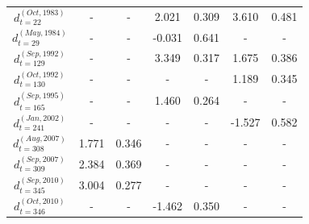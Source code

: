 \documentclass[a4paper]{IEEEtran}
\providecommand{\DIFadd}[1]{{\protect\color{blue}\uwave{#1}}} %
\providecommand{\DIFdel}[1]{{\protect\color{red}\sout{#1}}}                      %
\providecommand{\DIFaddFL}[1]{\DIFadd{#1}} %
\providecommand{\DIFdelFL}[1]{\DIFdel{#1}} %
\providecommand{\DIFaddbeginFL}{} %
\providecommand{\DIFaddendFL}{} %
\providecommand{\DIFdelbeginFL}{} %
\providecommand{\DIFdelendFL}{} %
\begin{document}
\begin{table}[htbp]
\begin{tabular}{ccccccc}
\DIFdelbeginFL \DIFdelFL{$d_{t=22}^{(Oct, 1983)}$   }\DIFdelendFL \DIFaddbeginFL \DIFaddFL{$D_{t=22}^{(Oct, 1983)}$   }\DIFaddendFL & -          & -         & 2.021      & 0.309     & 3.610      & 0.481     \\
\DIFdelbeginFL \DIFdelFL{$d_{t=29}^{(May, 1984)}$   }\DIFdelendFL \DIFaddbeginFL \DIFaddFL{$D_{t=29}^{(May, 1984)}$   }\DIFaddendFL & -          & -         & -0.031      & 0.641     & -          & -     \\
\DIFdelbeginFL \DIFdelFL{$d_{t=129}^{(Sep, 1992)}$  }\DIFdelendFL \DIFaddbeginFL \DIFaddFL{$D_{t=129}^{(Sep, 1992)}$  }\DIFaddendFL & -          & -         & 3.349      & 0.317     & 1.675      & 0.386     \\
\DIFdelbeginFL \DIFdelFL{$d_{t=130}^{(Oct, 1992)}$  }\DIFdelendFL \DIFaddbeginFL \DIFaddFL{$D_{t=130}^{(Oct, 1992)}$  }\DIFaddendFL & -          & -         & -          & -         & 1.189      & 0.345     \\
\DIFdelbeginFL \DIFdelFL{$d_{t=165}^{(Sep, 1995)}$  }\DIFdelendFL \DIFaddbeginFL \DIFaddFL{$D_{t=165}^{(Sep, 1995)}$  }\DIFaddendFL & -          & -         & 1.460      & 0.264     & -          & -     \\
\DIFdelbeginFL \DIFdelFL{$d_{t=241}^{(Jan, 2002)}$  }\DIFdelendFL \DIFaddbeginFL \DIFaddFL{$D_{t=241}^{(Jan, 2002)}$  }\DIFaddendFL & -          & -         & -          & -         &-1.527      & 0.582     \\
\DIFdelbeginFL \DIFdelFL{$d_{t=308}^{(Aug, 2007)}$  }\DIFdelendFL \DIFaddbeginFL \DIFaddFL{$D_{t=308}^{(Aug, 2007)}$  }\DIFaddendFL & 1.771      & 0.346     & -          & -         & -          & -         \\
\DIFdelbeginFL \DIFdelFL{$d_{t=309}^{(Sep, 2007)}$  }\DIFdelendFL \DIFaddbeginFL \DIFaddFL{$D_{t=309}^{(Sep, 2007)}$  }\DIFaddendFL & 2.384      & 0.369     & -          & -         & -          & -         \\
\DIFdelbeginFL \DIFdelFL{$d_{t=345}^{(Sep, 2010)}$  }\DIFdelendFL \DIFaddbeginFL \DIFaddFL{$D_{t=345}^{(Sep, 2010)}$  }\DIFaddendFL & 3.004      & 0.277     & -          & -         & -          & -         \\
\DIFdelbeginFL \DIFdelFL{$d_{t=346}^{(Oct, 2010)}$  }\DIFdelendFL \DIFaddbeginFL \DIFaddFL{$D_{t=346}^{(Oct, 2010)}$  }\DIFaddendFL & -          & -         & -1.462     & 0.350     & -          & - \\\hline
\end{tabular}
\label{table1}
\end{table}
\end{document}
